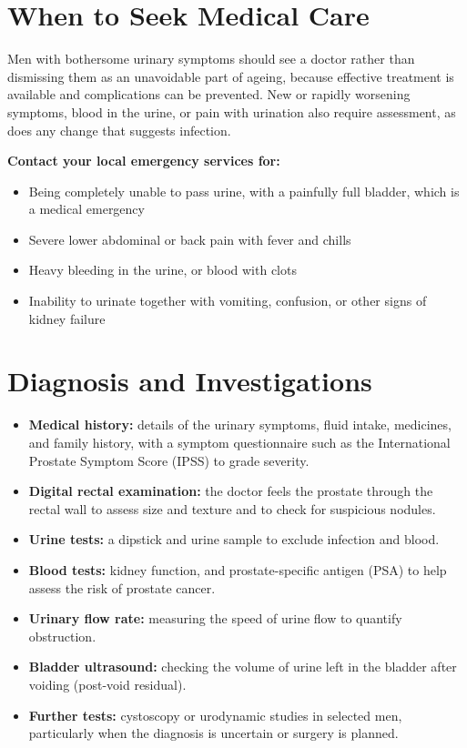 \section*{When to Seek Medical Care}
Men with bothersome urinary symptoms should see a doctor rather than dismissing them as an unavoidable part of ageing, because effective treatment is available and complications can be prevented. New or rapidly worsening symptoms, blood in the urine, or pain with urination also require assessment, as does any change that suggests infection.

\textbf{Contact your local emergency services for:}
\begin{itemize}
    \item Being completely unable to pass urine, with a painfully full bladder, which is a medical emergency
    \item Severe lower abdominal or back pain with fever and chills
    \item Heavy bleeding in the urine, or blood with clots
    \item Inability to urinate together with vomiting, confusion, or other signs of kidney failure
\end{itemize}

\section*{Diagnosis and Investigations}
\begin{itemize}
    \item \textbf{Medical history:} details of the urinary symptoms, fluid intake, medicines, and family history, with a symptom questionnaire such as the International Prostate Symptom Score (IPSS) to grade severity.
    \item \textbf{Digital rectal examination:} the doctor feels the prostate through the rectal wall to assess size and texture and to check for suspicious nodules.
    \item \textbf{Urine tests:} a dipstick and urine sample to exclude infection and blood.
    \item \textbf{Blood tests:} kidney function, and prostate-specific antigen (PSA) to help assess the risk of prostate cancer.
    \item \textbf{Urinary flow rate:} measuring the speed of urine flow to quantify obstruction.
    \item \textbf{Bladder ultrasound:} checking the volume of urine left in the bladder after voiding (post-void residual).
    \item \textbf{Further tests:} cystoscopy or urodynamic studies in selected men, particularly when the diagnosis is uncertain or surgery is planned.
\end{itemize}

